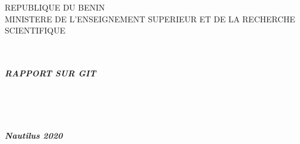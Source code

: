 		\begin{titlepage}
		\begin{center}
			\begin{bf}
				REPUBLIQUE DU BENIN\\
				\vspace{0.5cm}
				MINISTERE DE L'ENSEIGNEMENT SUPERIEUR ET DE LA RECHERCHE SCIENTIFIQUE\\
				\vspace{0.5cm}
				
				\vspace{0.5cm}
			\end{bf}
			\vspace{1cm}
			\textbf{{}}\\
			\vspace{0.75cm}
			\hrulefill\\
			\textbf{\textsl{RAPPORT SUR GIT }}\\
			\hrulefill\\
			\vspace{1cm}
			\\[1ex]
			
			\\
			\vspace{5cm}
			\begin{center}
				\textbf{\textsl{ Nautilus 2020}}
			\end{center}
			
		\end{center}
	\end{titlepage}